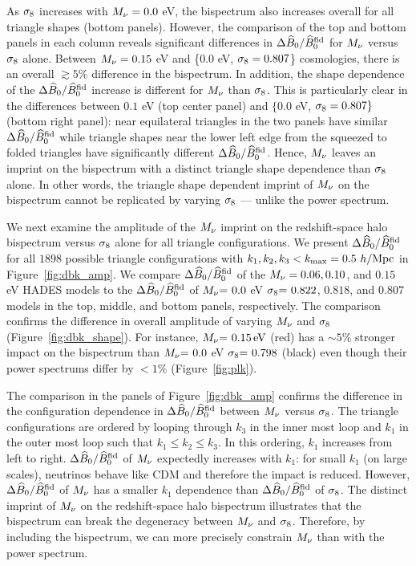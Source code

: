 As $\sigma_8$ increases with $M_\nu = 0.0$ eV, the bispectrum also increases 
overall for all triangle shapes (bottom panels). However, the comparison of the
top and bottom panels in each column reveals significant differences in 
$\Delta \widehat{B}_0/\widehat{B}_0^{\rm fid}$ for $M_\nu$ versus $\sigma_8$ alone. Between 
$M_\nu=0.15$ eV and \{$0.0$ eV, $\sigma_8 = 0.807$\} cosmologies, there is an overall 
$\gtrsim 5\%$ difference in the bispectrum. In addition, the shape dependence 
of the $\Delta \widehat{B}_0/\widehat{B}_0^{\rm fid}$ increase is different for $M_\nu$ than $\sigma_8$. 
This is particularly clear in the differences between $0.1$ eV (top center panel) 
and $\{$0.0 eV, $\sigma_8=0.807\}$ 
(bottom right panel): near equilateral triangles in the two panels have similar 
$\Delta \widehat{B}_0/\widehat{B}_0^{\rm fid}$ while triangle shapes near the lower left edge from 
the squeezed to folded triangles have significantly different $\Delta \widehat{B}_0/\widehat{B}_0^{\rm fid}$. 
Hence, $M_\nu$ leaves an imprint on the bispectrum with a distinct triangle 
shape dependence than $\sigma_8$ alone. In other words, the triangle shape dependent 
imprint of $M_\nu$ on the bispectrum cannot be replicated by varying $\sigma_8$ --- 
unlike the power spectrum. 

We next examine the amplitude of the $M_\nu$ imprint on the redshift-space halo 
bispectrum versus $\sigma_8$ alone for all triangle configurations. We present 
$\Delta \widehat{B}_0/\widehat{B}_0^{\rm fid}$ for all $1898$ possible triangle configurations 
with $k_1, k_2, k_3 < k_{\rm max} = 0.5~h/{\rm Mpc}$ in Figure~\ref{fig:dbk_amp}. 
We compare $\Delta \widehat{B}_0/\widehat{B}_0^{\rm fid}$ of the $M_\nu = 0.06, 0.10$, and 
$0.15$ eV HADES models to the $\Delta \widehat{B}_0/\widehat{B}_0^\mathrm{fid}$ of 
$M_\nu{=}~0.0$ eV $\sigma_8{=}~0.822$, $0.818$, and $0.807$ models in the
top, middle, and bottom panels, respectively. The comparison confirms the 
difference in overall amplitude of varying $M_\nu$ and $\sigma_8$ (Figure~\ref{fig:dbk_shape}). 
For instance, $M_\nu{=}~0.15\,\mathrm{eV}$ (red) has a $\sim 5\%$ stronger 
impact on the bispectrum than $M_\nu{=}~0.0$ eV $\sigma_8{=}~0.798$ (black) 
even though their power spectrums differ by $< 1\%$ (Figure~\ref{fig:plk}).

The comparison in the panels of Figure~\ref{fig:dbk_amp} confirms the difference 
in the configuration dependence in $\Delta \widehat{B}_0/\widehat{B}_0^\mathrm{fid}$ between $M_\nu$ 
versus $\sigma_8$. The triangle configurations are ordered by looping through $k_3$ 
in the inner most loop and $k_1$ in the outer most loop such that $k_1 \leq k_2 \leq k_3$. 
In this ordering, $k_1$ increases from left to right. $\Delta \widehat{B}_0/\widehat{B}_0^\mathrm{fid}$ 
of $M_\nu$ expectedly increases with $k_1$: for small $k_1$ (on large scales), 
neutrinos behave like CDM and therefore the impact is reduced. However, 
$\Delta \widehat{B}_0/\widehat{B}_0^\mathrm{fid}$ of $M_\nu$ has a smaller $k_1$ dependence than 
$\Delta \widehat{B}_0/\widehat{B}_0^\mathrm{fid}$ of $\sigma_8$. The distinct imprint of $M_\nu$ on the redshift-space 
halo bispectrum illustrates that the bispectrum can break the degeneracy between 
$M_\nu$ and $\sigma_8$. Therefore, by including the bispectrum, we can more precisely
constrain $M_\nu$ than with the power spectrum. 
